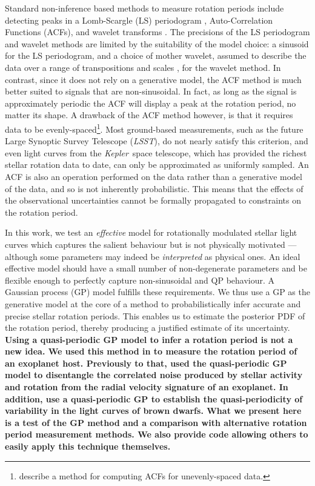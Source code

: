 \documentclass[a4paper,fleqn,usenatbib,useAMS]{mnras}
\newcommand{\Kepler}{{\it Kepler}}
\newcommand{\LSST}{{\it LSST}}
\newcommand{\eg}{{\it e.g.}}
\begin{document}
Standard non-inference based methods to measure rotation periods include
detecting peaks in a Lomb-Scargle \citep{Lomb1976, Scargle1982} (LS)
periodogram \citep[\eg][]{Reinhold2013}, Auto-Correlation Functions (ACFs),
\citep[\eg][]{Mcquillan13b} and wavelet transforms \citep[\eg][]{Garcia2014}.
The precisions of the LS periodogram and wavelet methods are limited by the
suitability of the model choice: a sinusoid for the LS periodogram, and a
choice of mother wavelet, assumed to describe the data over a range of
transpositions and scales \citep[see, \eg][]{Carter2010}, for the wavelet
method.
In contrast, since it does not rely on a generative model, the ACF method is
much better suited to signals that are non-sinusoidal.
In fact, as long as the signal is approximately periodic the ACF will
display a peak at the rotation period, no matter its shape.
A drawback of the ACF method however, is that it requires data to be
evenly-spaced\footnote{\citet{Edelson1988} describe a method for computing
ACFs for unevenly-spaced data.}.
Most ground-based measurements, such as the future Large Synoptic Survey
Telescope (\LSST), do not nearly satisfy this criterion, and even
light curves from the \Kepler\ space telescope, which has provided the richest
stellar rotation data to date, can only be approximated as uniformly sampled.
An ACF is also an operation performed on the data rather than a generative
model of the data, and so is not inherently probabilistic.
This means that the effects of the observational uncertainties cannot be
formally propagated to constraints on the rotation period.

In this work, we test an {\it effective} model for rotationally modulated
stellar light curves which captures the salient behaviour but is not
physically motivated --- although some parameters may indeed be {\it
interpreted} as physical ones.
An ideal effective model should have a small number of non-degenerate
parameters and be flexible enough to perfectly capture non-sinusoidal and QP
behaviour.
A Gaussian process (GP) model fulfills these requirements. We thus use a GP
as the generative model at the core of a method to probabilistically
infer accurate and precise stellar rotation periods.
This enables us to estimate the posterior PDF of the rotation period, thereby
producing a justified estimate of its uncertainty.
{\bf Using a quasi-periodic GP model to infer a rotation period is not a new idea.
We used this method in \citet{Vanderburg2015} to measure the rotation period
of an exoplanet host.
Previously to that, \citet{Haywood2014} used the quasi-periodic GP model
to disentangle the correlated noise produced by stellar activity and rotation
from the radial velocity signature of an exoplanet.
In addition, \citet{Littlefair2017} use a quasi-periodic GP to establish the
quasi-periodicity of variability in the light curves of brown dwarfs.
What we present here is a test of the GP method and a comparison with
alternative rotation period measurement methods.
We also provide code allowing others to easily apply this technique
themselves.}
\end{document}
